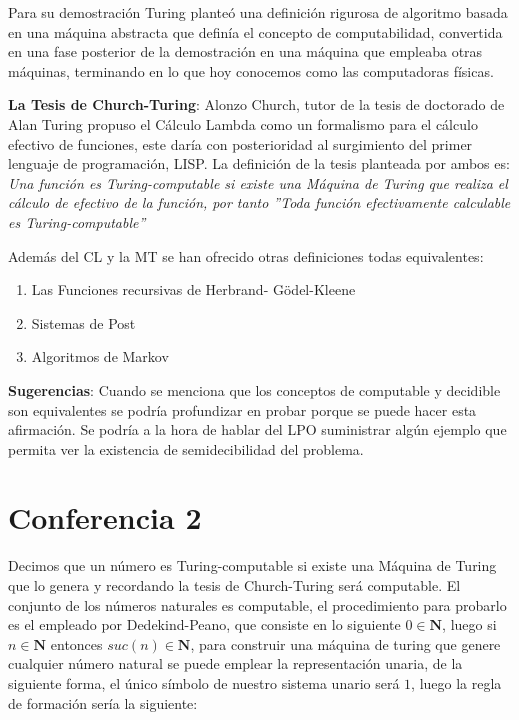 \documentclass[]{article}
\begin{document}
Para su demostraci\'on Turing plante\'o una definici\'on rigurosa de algoritmo basada en una m\'aquina abstracta que defin\'ia el concepto de computabilidad, convertida en una fase posterior de la demostraci\'on en una m\'aquina que empleaba otras m\'aquinas, terminando en lo que hoy conocemos como las computadoras f\'isicas.

\textbf{La Tesis de Church-Turing}: Alonzo Church, tutor de la tesis de doctorado de Alan Turing propuso el C\'alculo Lambda como un formalismo para el c\'alculo efectivo de funciones, este dar\'ia con posterioridad al surgimiento del primer lenguaje de programaci\'on, LISP. La definici\'on de la tesis planteada por ambos es: \textit{Una funci\'on es Turing-computable si existe una M\'aquina de Turing que realiza el c\'alculo de efectivo de la funci\'on, por tanto ''Toda funci\'on efectivamente calculable es Turing-computable''}

Adem\'as del CL y la MT se han ofrecido otras definiciones todas equivalentes:
\begin{enumerate}
	\item Las Funciones recursivas de Herbrand- Gödel-Kleene 
	\item Sistemas de Post  
	\item Algoritmos de Markov
\end{enumerate}

\textbf{Sugerencias}: Cuando se menciona que los conceptos de computable y decidible son equivalentes se podr\'ia profundizar en probar porque se puede hacer esta afirmaci\'on. Se podr\'ia a la hora de hablar del LPO suministrar alg\'un ejemplo que permita ver la existencia de semidecibilidad del problema.


\section*{Conferencia 2}

Decimos que un n\'umero es Turing-computable si existe una M\'aquina de Turing que lo genera y recordando la tesis de Church-Turing ser\'a computable. El conjunto de los n\'umeros naturales es computable, el procedimiento para probarlo es el empleado por Dedekind-Peano, que consiste en lo siguiente $0 \in \textbf{N}$, luego si $n \in \textbf{N}$ entonces $suc(n) \in \textbf{N}$, para construir una m\'aquina de turing que genere cualquier n\'umero natural se puede emplear la representaci\'on unaria, de la siguiente forma, el \'unico s\'imbolo de nuestro sistema unario ser\'a $1$, luego la regla de formaci\'on ser\'ia la siguiente:
\end{document}
